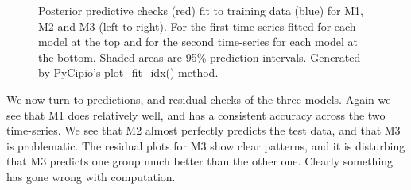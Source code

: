 \documentclass{article}
\begin{document}
\begin{figure}[ht]
    \centering
    \quad
    \quad
    \caption{Posterior predictive checks (red) fit to training data (blue) for M1, M2 and M3 (left to right). For the first time-series fitted for each model at the top and for the second time-series for each model at the bottom. Shaded areas are 95\% prediction intervals. Generated by PyCipio's plot\_fit\_idx() method. }
\end{figure}

\noindent We now turn to predictions, and residual checks of the three models. Again we see that M1 does relatively well, and has a consistent accuracy across the two time-series. We see that M2 almost perfectly predicts the test data, and that M3 is problematic. The residual plots for M3 show clear patterns, and it is disturbing that M3 predicts one group much better than the other one. Clearly something has gone wrong with computation.  
\end{document}
